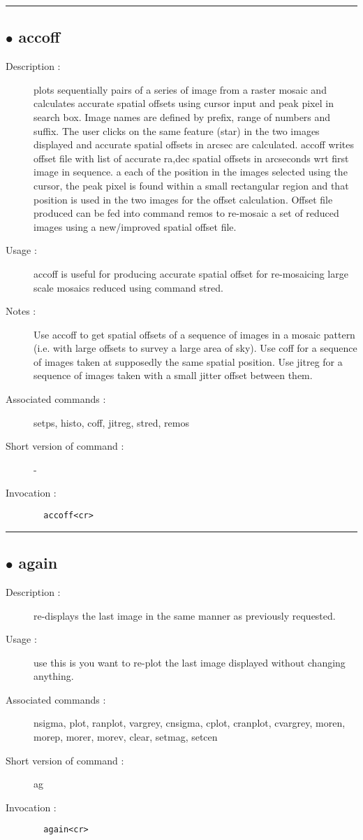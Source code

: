 \hrule \subsection*{$\bullet$ accoff}
\begin{description}
\item[Description :] plots sequentially pairs of a series of image from a raster
mosaic and calculates accurate spatial offsets using cursor input and
peak pixel in search box.  Image names are defined by prefix, range of
numbers and suffix.  The user clicks on the same feature (star) in the
two images displayed and accurate spatial offsets in arcsec are
calculated. accoff writes offset file with list of accurate ra,dec
spatial offsets in arcseconds wrt first image in sequence. a each of the
position in the images selected using the cursor, the peak pixel is found
within a small rectangular region and that position is used in the two
images for the offset calculation. Offset file produced can be fed into
command remos to re-mosaic a set of reduced images using a new/improved
spatial offset file.
\item[Usage :] accoff is useful for producing accurate spatial offset for
re-mosaicing large scale mosaics reduced using command stred.
\item[Notes :] Use accoff to get spatial offsets of a sequence of images in a
mosaic pattern (i.e. with large offsets to survey a large area of sky).
Use coff for a sequence of images taken at supposedly the same spatial
position. Use jitreg for a sequence of images taken with a small jitter
offset between them.
\item[Associated commands :] setps, histo, coff, jitreg, stred, remos
\item[Short version of command :] -
\item[Invocation :]

\verb+  accoff<cr> +\end{description}

\hrule \subsection*{$\bullet$ again}
\begin{description}
\item[Description :] re-displays the last image in the same manner as previously
requested. 
\item[Usage :] use this is you want to re-plot the last image displayed without
changing anything.
\item[Associated commands :] nsigma, plot, ranplot, vargrey, cnsigma, cplot,
cranplot, cvargrey, moren, morep, morer, morev, clear, setmag, setcen
\item[Short version of command :] ag
\item[Invocation :]

\verb+  again<cr> +\end{description}

